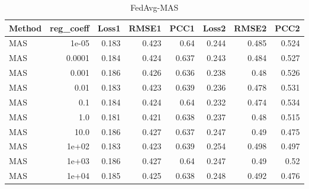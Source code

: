 \begin{table}
\caption{FedAvg-MAS}
\begin{tabular}{lrrrrrrr}
\toprule
Method & reg_coeff & Loss1 & RMSE1 & PCC1 & Loss2 & RMSE2 & PCC2 \\
\midrule
MAS & 1e-05 & 0.183 & 0.423 & 0.64 & 0.244 & 0.485 & 0.524 \\
MAS & 0.0001 & 0.184 & 0.424 & 0.637 & 0.243 & 0.484 & 0.527 \\
MAS & 0.001 & 0.186 & 0.426 & 0.636 & 0.238 & 0.48 & 0.526 \\
MAS & 0.01 & 0.183 & 0.423 & 0.639 & 0.236 & 0.478 & 0.531 \\
MAS & 0.1 & 0.184 & 0.424 & 0.64 & 0.232 & 0.474 & 0.534 \\
MAS & 1.0 & 0.181 & 0.421 & 0.638 & 0.237 & 0.48 & 0.515 \\
MAS & 10.0 & 0.186 & 0.427 & 0.637 & 0.247 & 0.49 & 0.475 \\
MAS & 1e+02 & 0.183 & 0.423 & 0.639 & 0.254 & 0.498 & 0.497 \\
MAS & 1e+03 & 0.186 & 0.427 & 0.64 & 0.247 & 0.49 & 0.52 \\
MAS & 1e+04 & 0.185 & 0.425 & 0.638 & 0.248 & 0.492 & 0.476 \\
\bottomrule
\end{tabular}
\end{table}
